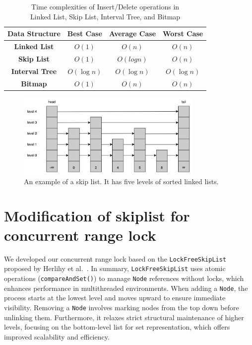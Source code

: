 \begin{table}[h!]
    \centering
    \begin{tabular}{|c|c|c|c|}
        \hline
        \textbf{Data Structure} & \textbf{Best Case} & \textbf{Average Case} & \textbf{Worst Case} \\ \hline
        \textbf{Linked List} & $O(1)$ & $O(n)$ & $O(n)$ \\ \hline
        \textbf{Skip List} & $O(1)$ & $O(logn)$ & $O(n)$ \\ \hline
        \textbf{Interval Tree} & $O(\log n)$ & $O(\log n)$ & $O(\log n)$ \\ \hline
        \textbf{Bitmap} & $O(1)$ & $O(n)$ & $O(n)$ \\ \hline
    \end{tabular}
    \caption{Time complexities of Insert/Delete operations in \\ Linked List, Skip List, Interval Tree, and Bitmap}
    \label{tab:insertdeletecomplexity}
\end{table}

\begin{figure}[h!]
    \centering
    \includegraphics[width=0.8\textwidth]{./figures/skiplist.png}
    \caption{An example of a skip list. It has five levels of sorted linked lists.}
    \label{fig:skiplist}
\end{figure}

\section{Modification of skiplist for concurrent range lock}

We developed our concurrent range lock based on the \texttt{LockFreeSkipList} proposed by Herlihy et al.~\parencite{herlihy2020art}.
In summary, \texttt{LockFreeSkipList} uses atomic operations (\texttt{compareAndSet()}) to manage \texttt{Node} references without locks, which enhances performance in multithreaded environments.
When adding a \texttt{Node}, the process starts at the lowest level and moves upward to ensure immediate visibility.
Removing a \texttt{Node} involves marking nodes from the top down before unlinking them.
Furthermore, it relaxes strict structural maintenance of higher levels, focusing on the bottom-level list for set representation, which offers improved scalability and efficiency.

